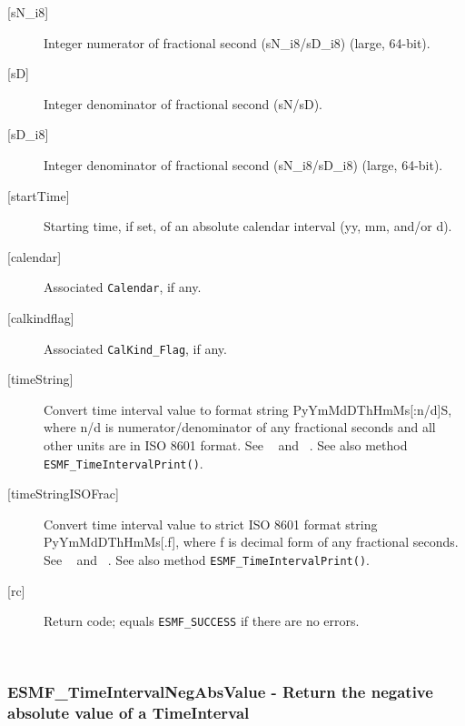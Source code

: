 \begin{description}
       \item[{[sN\_i8]}]
            Integer numerator of fractional second (sN\_i8/sD\_i8)
                                                             (large, 64-bit).
       \item[{[sD]}]
            Integer denominator of fractional second (sN/sD).
       \item[{[sD\_i8]}]
            Integer denominator of fractional second (sN\_i8/sD\_i8)
                                                             (large, 64-bit).
       \item[{[startTime]}]
            Starting time, if set, of an absolute calendar interval
            (yy, mm, and/or d).
       \item[{[calendar]}]
            Associated {\tt Calendar}, if any.
       \item[{[calkindflag]}]
            Associated {\tt CalKind\_Flag}, if any.
       \item[[{timeString]}]
            \begin{sloppypar}
            Convert time interval value to format string PyYmMdDThHmMs[:n/d]S,
            where n/d is numerator/denominator of any fractional seconds and
            all other units are in ISO 8601 format.  See ~\cite{ISO} and
            ~\cite{ISOnotes}.  See also method
            {\tt ESMF\_TimeIntervalPrint()}.
            \end{sloppypar}
       \item[{[timeStringISOFrac]}]
            Convert time interval value to strict ISO 8601 format string
            PyYmMdDThHmMs[.f], where f is decimal form of any fractional
            seconds.  See ~\cite{ISO} and ~\cite{ISOnotes}. See also method
            {\tt ESMF\_TimeIntervalPrint()}.
       \item[{[rc]}]
            Return code; equals {\tt ESMF\_SUCCESS} if there are no errors.
       \end{description}
   
 
\mbox{}\hrulefill\ 
 
\subsubsection [ESMF\_TimeIntervalNegAbsValue] {ESMF\_TimeIntervalNegAbsValue - Return the negative absolute value of a TimeInterval}


